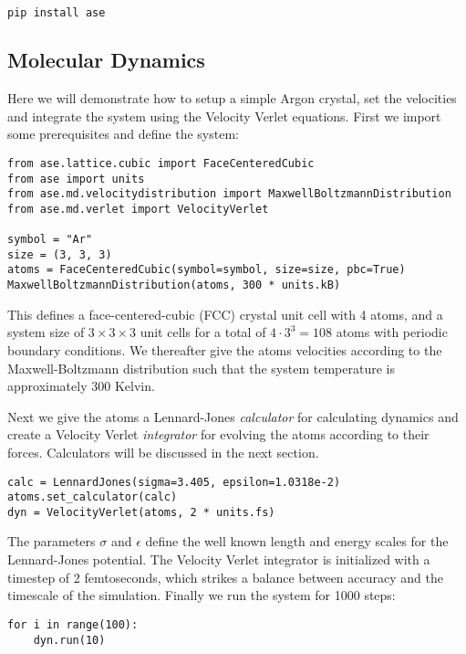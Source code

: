 \begin{lstlisting}[language=bash]
pip install ase
\end{lstlisting}

\subsection{Molecular Dynamics}
Here we will demonstrate how to setup a simple Argon crystal,
set the velocities and integrate the system using
the Velocity Verlet equations.
First we import some prerequisites and define the system:

\begin{verbatim}
from ase.lattice.cubic import FaceCenteredCubic
from ase import units
from ase.md.velocitydistribution import MaxwellBoltzmannDistribution
from ase.md.verlet import VelocityVerlet

symbol = "Ar"
size = (3, 3, 3)
atoms = FaceCenteredCubic(symbol=symbol, size=size, pbc=True)
MaxwellBoltzmannDistribution(atoms, 300 * units.kB)
\end{verbatim}

This defines a face-centered-cubic (FCC) crystal unit cell
with 4 atoms, and a system size of $3\times3\times3$ unit cells
for a total of $4\cdot3^3 = 108$ atoms with periodic boundary conditions.
We thereafter give the atoms velocities according to the
Maxwell-Boltzmann distribution such that the system temperature
is approximately 300 Kelvin.
\par
Next we give the atoms a Lennard-Jones \textit{calculator}
for calculating dynamics and create a Velocity Verlet \textit{integrator}
for evolving the atoms according to their forces.
Calculators will be discussed in the next section.

\begin{verbatim}
calc = LennardJones(sigma=3.405, epsilon=1.0318e-2)
atoms.set_calculator(calc)
dyn = VelocityVerlet(atoms, 2 * units.fs)
\end{verbatim}

The parameters $\sigma$ and $\epsilon$ define the well known
length and energy scales for the Lennard-Jones potential.
The Velocity Verlet integrator is initialized with a timestep
of 2 femtoseconds, which strikes a balance between accuracy
and the timescale of the simulation.
Finally we run the system for 1000 steps:

\begin{verbatim}
for i in range(100):
    dyn.run(10)
\end{verbatim}

